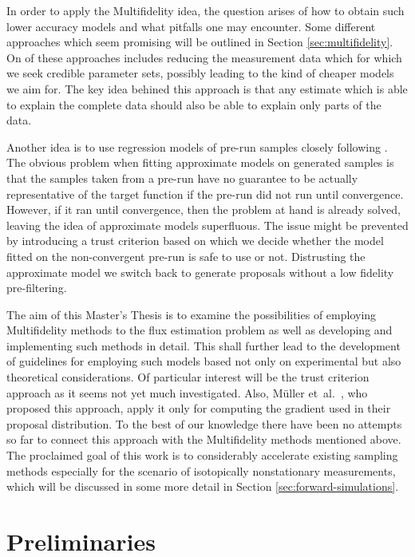 \documentclass[10pt]{article}
\newcommand{\etal}{et~al.~}
\begin{document}
In order to apply the Multifidelity idea, the question arises of how to obtain such lower 
accuracy models and what pitfalls one may encounter.
Some different approaches which seem promising will be outlined in Section 
\ref{sec:multifidelity}.
On of these approaches includes reducing the measurement data which for which we seek credible
parameter sets, possibly leading to the kind of cheaper models we aim for.
The key idea behined this approach is that any estimate which is able to explain the complete 
data should also be able to explain only parts of the data.

Another idea is to use regression models of pre-run samples closely following \cite{muller20}.
The obvious problem when fitting approximate models on generated samples is that the samples 
taken from a pre-run have no guarantee to be actually representative of the target function 
if the pre-run did not run until convergence.
However, if it ran until convergence, then the problem at hand is already solved, leaving the 
idea of approximate models superfluous.
The issue might be prevented by introducing a trust criterion based on which we decide whether 
the model fitted on the non-convergent pre-run is safe to use or not.
Distrusting the approximate model we switch back to generate proposals without a low fidelity 
pre-filtering. 

\bigskip \noindent 
The aim of this Master's Thesis is to examine the possibilities of employing Multifidelity 
methods to the flux estimation problem as well as developing and implementing such methods in 
detail.
This shall further lead to the development of guidelines for employing such models based not 
only on experimental but also theoretical considerations.
Of particular interest will be the trust criterion approach as it seems not yet much 
investigated.
Also, M\"uller \etal \cite{muller20}, who proposed this approach, apply it only for computing 
the gradient used in their proposal distribution.
To the best of our knowledge there have been no attempts so far to connect this approach with 
the Multifidelity methods mentioned above.
The proclaimed goal of this work is to considerably accelerate existing sampling methods 
especially for the scenario of isotopically nonstationary measurements, which will be discussed 
in some more detail in Section \ref{sec:forward-simulations}.

\section{Preliminaries}
\label{sec:preliminaries}
\end{document}
